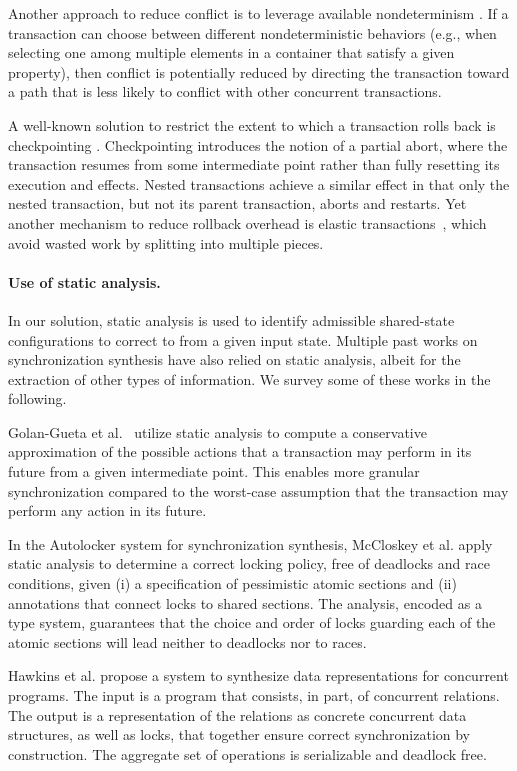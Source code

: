 Another approach to reduce conflict is to leverage available nondeterminism \cite{TKS:OOPSLA13}. If a transaction can choose between different nondeterministic behaviors (e.g., when selecting one among multiple elements in a container that satisfy a given property), then conflict is potentially reduced by directing the transaction toward a path that is less likely to conflict with other concurrent transactions.

A well-known solution to restrict the extent to which a transaction rolls back is checkpointing \cite{spaa08a,Egwutuoha:2013}. Checkpointing introduces the notion of a partial abort, where the transaction resumes from some intermediate point rather than fully resetting its execution and effects. Nested transactions \cite{ont,beeri} achieve a similar effect in that only the nested transaction, but not its parent transaction, aborts and restarts. Yet another mechanism to reduce rollback overhead is elastic transactions~\cite{FGG:DISC09}, which avoid wasted work by splitting into multiple pieces.  

\paragraph{Use of static analysis.} In our solution, static analysis is used to identify admissible shared-state configurations to correct to from a given input state. Multiple past works on synchronization synthesis have also relied on static analysis, albeit for the extraction of other types of information. We survey some of these works in the following.

Golan-Gueta et al.~\cite{GRSY:PLDI13} utilize static analysis to compute a conservative approximation of the possible actions that a transaction may perform in its future from a given intermediate point. This enables more granular synchronization compared to the worst-case assumption that the transaction may perform any action in its future.

In the Autolocker system for synchronization synthesis, McCloskey et al. \cite{popl/McCloskeyZGB06} apply static analysis to determine a correct locking policy, free of deadlocks and race conditions, given (i) a specification of pessimistic atomic sections and (ii) annotations that connect locks to shared sections. The analysis, encoded as a type system, guarantees that the choice and order of locks guarding each of the atomic sections will lead neither to deadlocks nor to races.

Hawkins et al. \cite{HawkinsAFRS12} propose a system to synthesize data representations for concurrent programs. The input is a program that consists, in part, of concurrent relations. The output is a representation of the relations as concrete concurrent data structures, as well as locks, that together ensure correct synchronization by construction. The aggregate set of operations is serializable and deadlock free.

